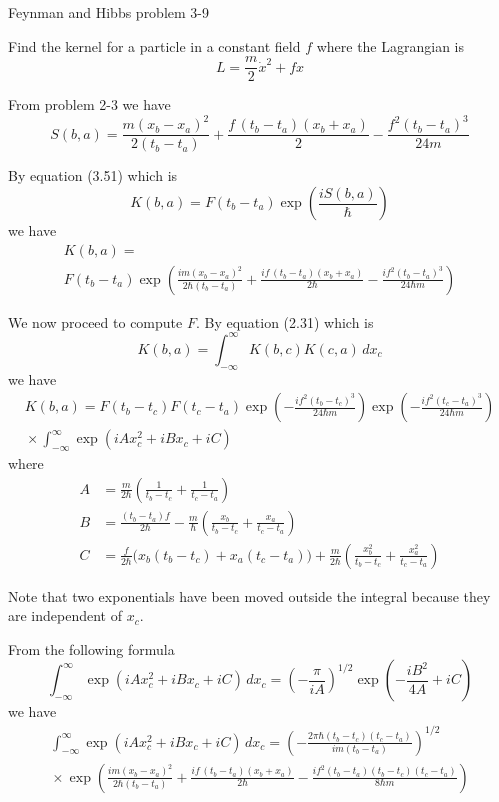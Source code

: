 \documentclass[12pt]{article}
\begin{document}
Feynman and Hibbs problem 3-9

\bigskip
Find the kernel for a particle in a constant field $f$
where the Lagrangian is
\begin{equation*}
L=\frac{m}{2}\dot x^2+fx
\end{equation*}

From problem 2-3 we have
\begin{equation*}
S(b,a)=\frac{m(x_b-x_a)^2}{2(t_b-t_a)}+\frac{f\,(t_b-t_a)(x_b+x_a)}{2}-\frac{f^2(t_b-t_a)^3}{24m}
\end{equation*}

By equation (3.51) which is
\begin{equation*}
K(b,a)=F(t_b-t_a)\exp\left(\frac{iS(b,a)}{\hbar}\right)
\end{equation*}
we have
\begin{multline*}
K(b,a)=
\\
F(t_b-t_a)\exp\left(
\frac{im(x_b-x_a)^2}{2\hbar(t_b-t_a)}
+\frac{if\,(t_b-t_a)(x_b+x_a)}{2\hbar}
-\frac{if^2(t_b-t_a)^3}{24\hbar m}
\right)
\tag{1}
\end{multline*}

We now proceed to compute $F$. By equation (2.31) which is
\begin{equation*}
K(b,a)=\int_{-\infty}^\infty K(b,c)K(c,a)\,dx_c
\end{equation*}
we have
\begin{multline*}
K(b,a)=F(t_b-t_c)F(t_c-t_a)
\exp\left(-\frac{if^2(t_b-t_c)^3}{24\hbar m}\right)
\exp\left(-\frac{if^2(t_c-t_a)^3}{24\hbar m}\right)
\\[1ex]
{}\times
\int_{-\infty}^\infty
\exp\left(iAx_c^2+iBx_c+iC\right)
\tag{2}
\end{multline*}
where
\begin{align*}
A&=\frac{m}{2\hbar}\left(\frac{1}{t_b-t_c}+\frac{1}{t_c-t_a}\right)
\tag{3}
\\
B&=\frac{(t_b-t_a)f}{2\hbar}-\frac{m}{\hbar}\left(\frac{x_b}{t_b-t_c}+\frac{x_a}{t_c-t_a}\right)
\tag{4}
\\
C&=\frac{f}{2\hbar}\big(x_b(t_b-t_c)+x_a(t_c-t_a)\big)+\frac{m}{2\hbar}
\left(\frac{x_b^2}{t_b-t_c}+\frac{x_a^2}{t_c-t_a}\right)
\tag{5}
\end{align*}

\bigskip
Note that two exponentials have been moved outside the integral because they are independent of $x_c$.

\bigskip
From the following formula
\begin{equation*}
\int_{-\infty}^{\infty}\exp(iAx_c^2+iBx_c+iC)\,dx_c
=\left(-\frac{\pi}{iA}\right)^{1/2}
\exp\left(-\frac{iB^2}{4A}+iC\right)
\end{equation*}
we have
{\footnotesize
\begin{multline*}
\int_{-\infty}^{\infty}\exp(iAx_c^2+iBx_c+iC)\,dx_c
=\left(-\frac{2\pi\hbar(t_b-t_c)(t_c-t_a)}{im(t_b-t_a)}\right)^{1/2}
\\
{}\times\exp\left(
\frac{im(x_b-x_a)^2}{2\hbar(t_b-t_a)}
+\frac{if\,(t_b-t_a)(x_b+x_a)}{2\hbar}
-\frac{if^2(t_b-t_a)(t_b-t_c)(t_c-t_a)}{8\hbar m}
\right)
\tag{6}
\end{multline*}
}
\end{document}
